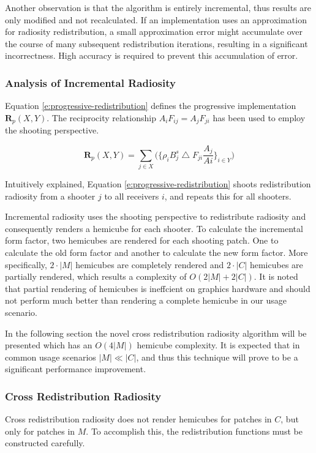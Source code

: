 Another observation is that the algorithm is entirely incremental, thus results are only modified and not recalculated. If an implementation uses an approximation for radiosity redistribution, a small approximation error might accumulate over the course of many subsequent redistribution iterations, resulting in a significant incorrectness. High accuracy is required to prevent this accumulation of error. 



\subsubsection{Analysis of Incremental Radiosity}
Equation \ref{e:progressive-redistribution} defines the progressive implementation $\mathbf{R}_p(X,Y)$. The reciprocity relationship $A_iF_{ij} = A_jF_{ji}$ has been used to employ the shooting perspective. 

\begin{equation}\label{e:progressive-redistribution}
	\mathbf{R}_p(X,Y)=\sum_{j\in X}\Biggr(\Biggr\{ \rho_i B^{s}_j \bigtriangleup F_{ji}\frac{A_j}{Ai} \Biggr\}_{i\in Y}\Biggr)
\end{equation}

Intuitively explained, Equation \ref{e:progressive-redistribution} shoots redistribution radiosity from a shooter $j$ to all receivers $i$, and repeats this for all shooters.

Incremental radiosity uses the shooting perspective to redistribute radiosity and consequently renders a hemicube for each shooter. To calculate the incremental form factor, two hemicubes are rendered for each shooting patch. One to calculate the old form factor and another to calculate the new form factor. More specifically, $2\cdot|M|$ hemicubes are completely rendered and $2\cdot |C|$ hemicubes are partially rendered, which results a complexity of $O(2|M|+2|C|)$. It is noted that partial rendering of hemicubes is ineffcient on graphics hardware and should not perform much better than rendering a complete hemicube in our usage scenario.

In the following section the novel cross redistribution radiosity algorithm will be presented which has an $O(4|M|)$ hemicube complexity. It is expected that in common usage scenarios $|M|\ll|C|$, and thus this technique will prove to be a significant performance improvement.

\subsubsection{Cross Redistribution Radiosity}
Cross redistribution radiosity does not render hemicubes for patches in $C$, but only for patches in $M$. To accomplish this, the redistribution functions must be constructed carefully. 

